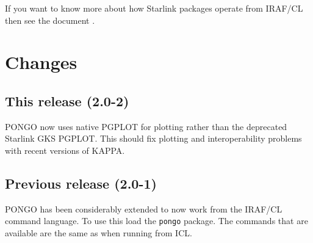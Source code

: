 If you want to know more about how Starlink packages operate from
IRAF/CL then see the document .

\section{Changes}
\subsection {This release (2.0-2)}

PONGO now uses native PGPLOT for plotting rather than the deprecated 
Starlink GKS PGPLOT. This should fix plotting and interoperability  
problems with recent versions of KAPPA.

\subsection{Previous release (2.0-1)}

PONGO has been considerably extended to now work from the IRAF/CL
command language. To use this load the \verb+pongo+ package. The 
commands that are available are the same as when running from ICL.

